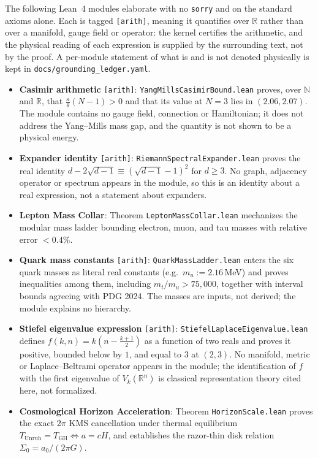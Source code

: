 \documentclass[twocolumn,amsmath,amssymb,floatfix]{article}
\begin{document}
The following Lean~4 modules elaborate with no \texttt{sorry} and on the standard axioms alone. Each is tagged \texttt{[arith]}, meaning it quantifies over $\mathbb{R}$ rather than over a manifold, gauge field or operator: the kernel certifies the arithmetic, and the physical reading of each expression is supplied by the surrounding text, not by the proof. A per-module statement of what is and is not denoted physically is kept in \texttt{docs/grounding\_ledger.yaml}.
\begin{itemize}
    \item \textbf{Casimir arithmetic} \texttt{[arith]}: \texttt{YangMillsCasimirBound.lean} proves, over $\mathbb{N}$ and $\mathbb{R}$, that $\frac{\kappa}{\theta}(N-1) > 0$ and that its value at $N = 3$ lies in $(2.06, 2.07)$. The module contains no gauge field, connection or Hamiltonian; it does not address the Yang--Mills mass gap, and the quantity is not shown to be a physical energy.
    \item \textbf{Expander identity} \texttt{[arith]}: \texttt{RiemannSpectralExpander.lean} proves the real identity $d - 2\sqrt{d-1} \equiv (\sqrt{d-1}-1)^2$ for $d \ge 3$. No graph, adjacency operator or spectrum appears in the module, so this is an identity about a real expression, not a statement about expanders.
    \item \textbf{Lepton Mass Collar}: Theorem \texttt{LeptonMassCollar.lean} mechanizes the modular mass ladder bounding electron, muon, and tau masses with relative error $<0.4\%$.
    \item \textbf{Quark mass constants} \texttt{[arith]}: \texttt{QuarkMassLadder.lean} enters the six quark masses as literal real constants (e.g.\ $m_u := 2.16$\,MeV) and proves inequalities among them, including $m_t / m_u > 75{,}000$, together with interval bounds agreeing with PDG 2024. The masses are inputs, not derived; the module explains no hierarchy.
    \item \textbf{Stiefel eigenvalue expression} \texttt{[arith]}: \texttt{StiefelLaplaceEigenvalue.lean} defines $f(k,n) = k(n - \frac{k+1}{2})$ as a function of two reals and proves it positive, bounded below by $1$, and equal to $3$ at $(2,3)$. No manifold, metric or Laplace--Beltrami operator appears in the module; the identification of $f$ with the first eigenvalue of $V_k(\mathbb{R}^n)$ is classical representation theory cited here, not formalized.
    \item \textbf{Cosmological Horizon Acceleration}: Theorem \texttt{HorizonScale.lean} proves the exact $2\pi$ KMS cancellation under thermal equilibrium $T_{\text{Unruh}} = T_{\text{GH}} \iff a = cH$, and establishes the razor-thin disk relation $\Sigma_0 = a_0 / (2\pi G)$.
\end{itemize}
\end{document}
